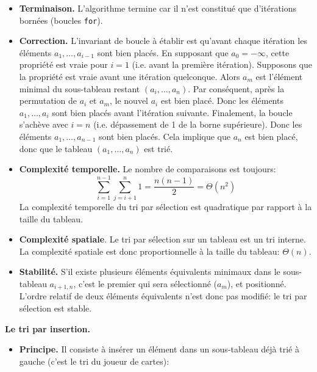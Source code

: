 \begin{enumerate}
\begin{itemize}
        \item \textbf{Terminaison.} L'algorithme termine car il n'est
          constitué que d'itérations bornées (boucles \verb+for+).

        \item \textbf{Correction.} L'invariant de boucle à établir est
          qu'avant chaque itération les éléments \(a_1, \ldots,
          a_{i-1}\) sont bien placés. En supposant que \(a_0 =
          -\infty\), cette propriété est vraie pour \(i=1\)
          (i.e. avant la première itération). Supposons que la
          propriété est vraie avant une itération quelconque. Alors
          \(a_m\) est l'élément minimal du sous-tableau restant
          \((a_i, \ldots, a_n)\). Par conséquent, après la permutation
          de \(a_i\) et \(a_m\), le nouvel \(a_i\) est bien
          placé. Donc les éléments \(a_1, \ldots, a_i\) sont bien
          placés avant l'itération suivante. Finalement, la boucle
          s'achève avec \(i = n\) (i.e. dépassement de 1 de la borne
          supérieure). Donc les éléments \(a_1, \ldots, a_{n-1}\) sont
          bien placés. Cela implique que \(a_n\) est bien placé, donc
          que le tableau \((a_1, \ldots, a_n)\) est trié.

        \item \textbf{Complexité temporelle.} Le nombre de
          comparaisons est toujours:
          \[
            \sum_{i=1}^{n-1}{\sum_{j=i+1}^{n}{1}} = \frac{n (n-1)}{2}
            = \Theta (n^2)
           \]
           La complexité temporelle du tri par sélection est
           quadratique par rapport à la taille du tableau.

        \item \textbf{Complexité spatiale}. Le tri par sélection sur
          un tableau est un tri interne. La complexité spatiale est
          donc proportionnelle à la taille du tableau: \(\Theta (n)\).

        \item \textbf{Stabilité.} S'il existe plusieurs éléments
          équivalents minimaux dans le sous-tableau \(a_{i+1,n}\),
          c'est le premier qui sera sélectionné (\(a_m\)), et
          positionné. L'ordre relatif de deux éléments équivalents
          n'est donc pas modifié: le tri par sélection est stable.

      \end{itemize} \textbf{Le tri par insertion.}
    \begin{itemize}

       \item \textbf{Principe.} Il consiste à insérer un élément dans
         un sous-tableau déjà trié à gauche (c'est le tri du joueur de
         cartes):


\end{itemize}
\end{enumerate}
